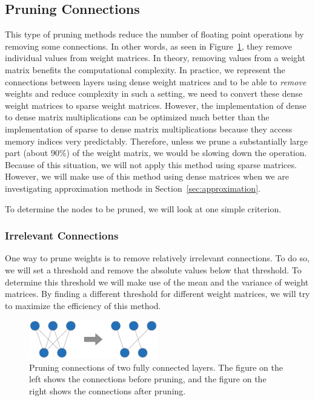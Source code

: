 \subsection{Pruning Connections}
This type of pruning methods reduce the number of floating point operations by removing some connections. In other words, as seen in Figure~\ref{fig:weight_pruning}, they remove individual values from weight matrices. In theory, removing values from a weight matrix benefits the computational complexity. In practice, we represent the connections between layers using dense weight matrices and to be able to \textit{remove} weights and reduce complexity in such a setting, we need to convert these dense weight matrices to sparse weight matrices. However, the implementation of dense to dense matrix multiplications can be optimized much better than the implementation of sparse to dense matrix multiplications because they access memory indices very predictably. Therefore, unless we prune a substantially large part (about $90\%$) of the weight matrix, we would be slowing down the operation. Because of this situation, we will not apply this method using sparse matrices. However, we will make use of this method using dense matrices when we are investigating approximation methods in Section~\ref{sec:approximation}.

To determine the nodes to be pruned, we will look at one simple criterion.

\subsubsection{Irrelevant Connections}
One way to prune weights is to remove relatively irrelevant connections. To do so, we will set a threshold and remove the absolute values below that threshold. To determine this threshold we will make use of the mean and the variance of weight matrices. By finding a different threshold for different weight matrices, we will try to maximize the efficiency of this method.

\begin{figure}[!h]
  \begin{center}
  \includegraphics[width=0.5\textwidth]{images/weight_pruning.pdf}
  \end{center}
  \caption{Pruning connections of two fully connected layers. The figure on the left shows the connections before pruning, and the figure on the right shows the connections after pruning.}
  \label{fig:weight_pruning}
\end{figure}

